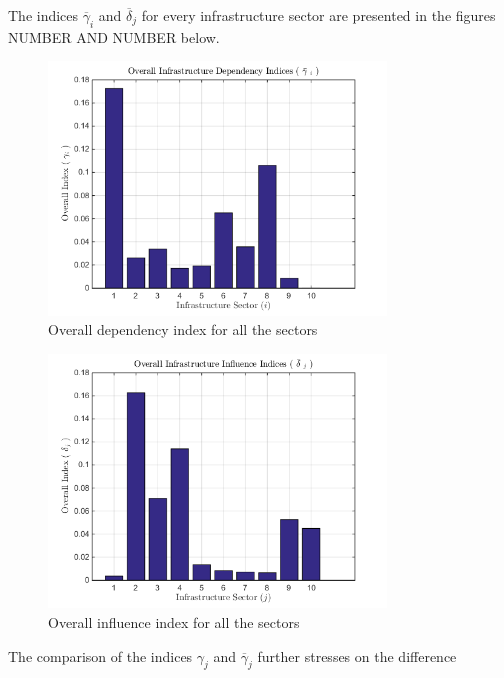 \documentclass[11pt,a4paper]{article}
\begin{document}
The indices $\overline\gamma_i$ and $\overline\delta_j$ for every infrastructure sector are presented in the figures NUMBER AND NUMBER below.

\begin{figure}
	\label{fig: Gamma bar}
	\centering
	\includegraphics[width=0.8\textwidth]
    {gamma_bar.png}
    \caption{Overall dependency index for all the sectors}
\end{figure}

\begin{figure}
	\label{fig: Delta bar}
	\centering
	\includegraphics[width=0.8\textwidth]
    {delta_bar.png}
    \caption{Overall influence index for all the sectors}
\end{figure}

The comparison of the indices $\gamma_j$ and $\overline\gamma_j$ further stresses on the difference
\end{document}
